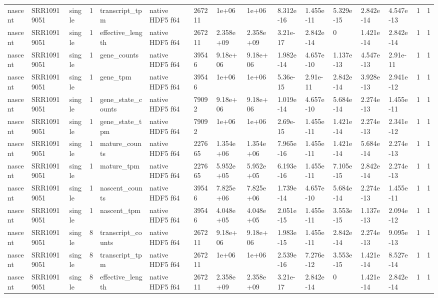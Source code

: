 \begin{tabular}{llllllllllllllll}
nascent & SRR10919051 & single & 1 & transcript\_tpm & native HDF5 f64 & 267211 & 1e+06 & 1e+06 & 8.312e-16 & 1.455e-11 & 5.329e-15 & 2.842e-14 & 4.547e-13 & 1 & 1 \\
nascent & SRR10919051 & single & 1 & effective\_length & native HDF5 f64 & 267211 & 2.358e+09 & 2.358e+09 & 3.21e-17 & 2.842e-14 & 0 & 1.421e-14 & 2.842e-14 & 1 & 1 \\
nascent & SRR10919051 & single & 1 & gene\_counts & native HDF5 f64 & 39546 & 9.18e+06 & 9.18e+06 & 1.982e-14 & 4.657e-10 & 1.137e-13 & 4.547e-13 & 2.91e-11 & 1 & 1 \\
nascent & SRR10919051 & single & 1 & gene\_tpm & native HDF5 f64 & 39546 & 1e+06 & 1e+06 & 5.36e-15 & 2.91e-11 & 2.842e-14 & 3.928e-13 & 2.941e-12 & 1 & 1 \\
nascent & SRR10919051 & single & 1 & gene\_state\_counts & native HDF5 f64 & 79092 & 9.18e+06 & 9.18e+06 & 1.019e-14 & 4.657e-10 & 5.684e-14 & 2.274e-13 & 1.455e-11 & 1 & 1 \\
nascent & SRR10919051 & single & 1 & gene\_state\_tpm & native HDF5 f64 & 79092 & 1e+06 & 1e+06 & 2.69e-15 & 1.455e-11 & 1.421e-14 & 2.274e-13 & 2.341e-12 & 1 & 1 \\
nascent & SRR10919051 & single & 1 & mature\_counts & native HDF5 f64 & 227665 & 1.354e+06 & 1.354e+06 & 7.965e-16 & 1.455e-11 & 1.421e-14 & 5.684e-14 & 2.274e-13 & 1 & 1 \\
nascent & SRR10919051 & single & 1 & mature\_tpm & native HDF5 f64 & 227665 & 5.952e+05 & 5.952e+05 & 6.193e-16 & 1.455e-11 & 7.105e-15 & 2.842e-14 & 2.274e-13 & 1 & 1 \\
nascent & SRR10919051 & single & 1 & nascent\_counts & native HDF5 f64 & 39546 & 7.825e+06 & 7.825e+06 & 1.739e-14 & 4.657e-10 & 5.684e-14 & 2.274e-13 & 1.455e-11 & 1 & 1 \\
nascent & SRR10919051 & single & 1 & nascent\_tpm & native HDF5 f64 & 39546 & 4.048e+05 & 4.048e+05 & 2.051e-15 & 1.455e-11 & 3.553e-15 & 1.137e-13 & 2.094e-12 & 1 & 1 \\
nascent & SRR10919051 & single & 8 & transcript\_counts & native HDF5 f64 & 267211 & 9.18e+06 & 9.18e+06 & 1.983e-15 & 1.455e-11 & 2.842e-14 & 2.274e-13 & 9.095e-13 & 1 & 1 \\
nascent & SRR10919051 & single & 8 & transcript\_tpm & native HDF5 f64 & 267211 & 1e+06 & 1e+06 & 2.539e-16 & 7.276e-12 & 3.553e-15 & 1.421e-14 & 8.527e-14 & 1 & 1 \\
nascent & SRR10919051 & single & 8 & effective\_length & native HDF5 f64 & 267211 & 2.358e+09 & 2.358e+09 & 3.21e-17 & 2.842e-14 & 0 & 1.421e-14 & 2.842e-14 & 1 & 1 \\

\end{tabular}
